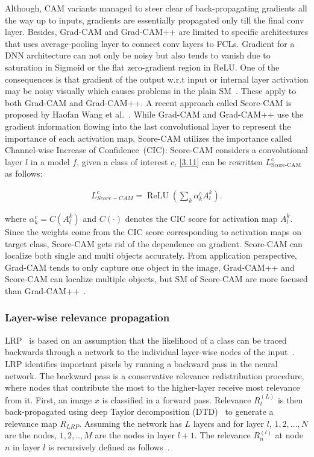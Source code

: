 \hspace*{3.5mm} Although, CAM variants managed to steer clear of back-propagating gradients all the way up to inputs, gradients are essentially propagated only till the final conv layer. Besides, Grad-CAM and Grad-CAM++ are limited to specific architectures that uses average-pooling layer to connect conv layers to FCLs. 
Gradient for a DNN architecture can not only be noisy but also tends to vanish due to saturation in Sigmoid or the flat zero-gradient region in ReLU. One of the consequences is that gradient of the output w.r.t input or internal layer activation may be noisy visually which causes problems in the plain SM~\cite{wang2020score}. 
\hspace*{3.5mm} These apply to both Grad-CAM and Grad-CAM++. A recent approach called Score-CAM is proposed by Haofan Wang et al.~\cite{wang2020score}. While Grad-CAM and Grad-CAM++ use the gradient information flowing into the last convolutional layer to represent the importance of each activation map, Score-CAM utilizes the importance called Channel-wise Increase of Confidence~(CIC): Score-CAM considers a convolutional layer $l$ in a model $f$, given a class of interest $c$, \cref{3.11} can be rewritten $L_{\text {Score-CAM}}^{c}$ as follows: 

\vspace{-4mm}
\begin{align}
    L_{S c o r e-C A M}^{c}=\operatorname{ReLU}\left(\sum_{k} \alpha_{k}^{c} A_{l}^{k}\right).
\end{align}
\vspace{-4mm}

\hspace*{3.5mm} where $\alpha_{k}^{c}=C\left(A_{l}^{k}\right)$ and  $C(\cdot)$ denotes the CIC score for activation map $A_{l}^{k}$. Since the weights come from the CIC score corresponding to activation maps on target class, Score-CAM gets rid of the dependence on gradient. Score-CAM can localize both single and multi objects accurately. From application perspective, Grad-CAM tends to only capture one object in the image, Grad-CAM++ and Score-CAM can localize multiple objects, but SM of Score-CAM are more focused than Grad-CAM++~\cite{wang2020score}.

\subsubsection{Layer-wise relevance propagation}
LRP~\cite{LRP1} is based on an assumption that the likelihood of a class can be traced backwards through a network to the individual layer-wise nodes of the input~\cite{LRP2}. LRP identifies important pixels by running a backward pass in the neural network. The backward pass is a conservative relevance redistribution procedure, where nodes that contribute the most to the higher-layer receive most relevance from it. First, an image $x$ is classified in a forward pass. Relevance $R_{t}^{(L)}$ is then back-propagated using deep Taylor decomposition (DTD)~\cite{DTD} to generate a relevance map $R_{LRP}$. Assuming the network has $L$ layers and for layer $l$, $1,2,...,N$ are the nodes, $1,2,..,M$ are the nodes in layer $l+ 1$. The relevance $R_{n}^{(l)}$ at node $n$ in layer $l$ is recursively defined as follows~\cite{LRP2}.  

